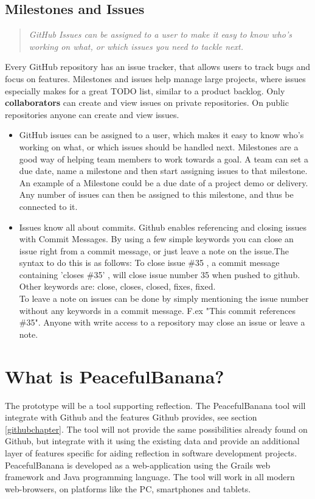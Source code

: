 \subsection{Milestones and Issues}
\begin{quote}
\em GitHub Issues can be assigned to a user to make it easy to know who's working on what, or which issues you need to tackle next.
\end{quote}
Every GitHub repository has an issue tracker, that allows users to track bugs and focus on features. Milestones and issues help manage large projects, where issues especially makes for a great TODO list, similar to a product backlog. Only {\bf collaborators} can create and view issues on private repositories. On public repositories anyone can create and view issues. 
\begin{itemize}
\item GitHub issues can be assigned to a user, which makes it easy to know who's working on what, or which issues should be handled next. Milestones are a good way of helping team members to work towards a goal. A team can set a due date, name a milestone and then start assigning issues to that milestone. An example of a Milestone could be a due date of a project demo or delivery. Any number of issues can then be assigned to this milestone, and thus be connected to it. 
\item Issues know all about commits. Github enables referencing and closing issues with Commit Messages. By using a few simple keywords you can close an issue right from a commit message, or just leave a note on the issue.The syntax to do this is as follows: To close issue \#35 , a commit message containing 'closes \#35' , will close issue number 35 when pushed to github. Other keywords are: close, closes, closed, fixes, fixed. \\
To leave a note on issues can be done by simply mentioning the issue number without any keywords in a commit message. F.ex "This commit references \#35". Anyone with write access to a repository may close an issue or leave a note.
\end{itemize}

\section{What is PeacefulBanana?}
The prototype will be a tool supporting reflection. The PeacefulBanana tool will integrate with Github and the features Github provides, see section \ref{githubchapter}. The tool will not provide the same possibilities already found on Github, but integrate with it using the existing data and provide an additional layer of features specific for aiding reflection in software development projects. PeacefulBanana is developed as a web-application using the Grails web framework and Java programming language. The tool will work in all modern web-browsers, on platforms like the PC, smartphones and tablets. 

